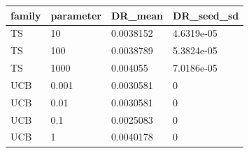 \begin{tabular}{llll}
\hline
family & parameter & DR\_mean & DR\_seed\_sd \\
\hline
TS & 10 & 0.0038152 & 4.6319e-05 \\
TS & 100 & 0.0038789 & 5.3824e-05 \\
TS & 1000 & 0.004055 & 7.0186e-05 \\
UCB & 0.001 & 0.0030581 & 0 \\
UCB & 0.01 & 0.0030581 & 0 \\
UCB & 0.1 & 0.0025083 & 0 \\
UCB & 1 & 0.0040178 & 0 \\
\hline
\end{tabular}
